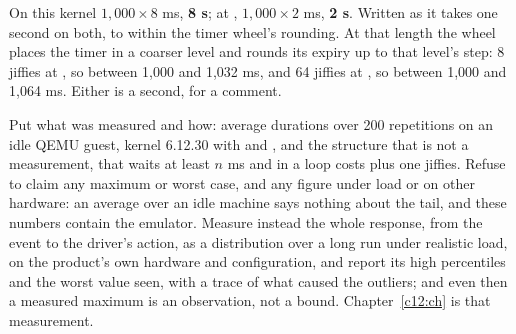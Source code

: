  On this kernel $1{,}000 \times 8$ ms, \textbf{8 s}; at , $1{,}000 \times 2$
ms, \textbf{2 s}. Written as  it takes one second on both, to within the timer
wheel's rounding. At that length the wheel places the timer in a coarser level and rounds its expiry
up to that level's step: 8 jiffies at , so between 1,000 and 1,032 ms, and 64 jiffies
at , so between 1,000 and 1,064 ms. Either is a second, for a comment.

 Put what was measured and how: average durations over 200 repetitions on an idle QEMU
guest, kernel 6.12.30 with  and , and the structure that is not a
measurement, that  waits at least $n$ ms and in a loop costs
 plus one jiffies. Refuse to claim any maximum or worst case, and any
figure under load or on other hardware: an average over an idle machine says nothing about the
tail, and these numbers contain the emulator. Measure instead the whole response, from the event to
the driver's action, as a distribution over a long run under realistic load, on the product's own
hardware and configuration, and report its high percentiles and the worst value seen, with a trace
of what caused the outliers; and even then a measured maximum is an observation, not a bound.
Chapter~\ref{c12:ch} is that measurement.
